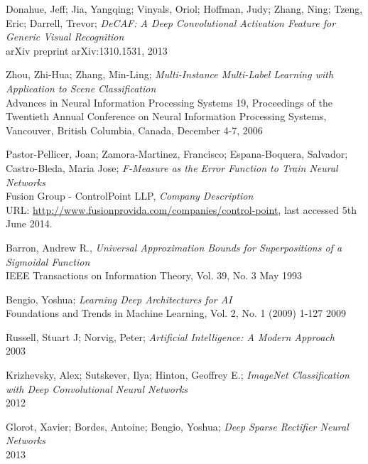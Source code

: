 \documentclass[a4paper,11pt]{article}
\begin{document}
\begin{thebibliography}{1}
 Donahue, Jeff; Jia, Yangqing; Vinyals, Oriol; Hoffman, Judy; Zhang, Ning; Tzeng, Eric; Darrell, Trevor;
  \emph{DeCAF: A Deep Convolutional Activation Feature for Generic Visual Recognition}\\
  arXiv preprint arXiv:1310.1531, 2013

 Zhou, Zhi-Hua; Zhang, Min-Ling;
  \emph{Multi-Instance Multi-Label Learning with Application to Scene Classification}\\
  Advances in Neural Information Processing Systems 19, 
  Proceedings of the Twentieth Annual Conference on Neural Information Processing Systems, 
  Vancouver, British Columbia, Canada, 
  December 4-7, 2006

 Pastor-Pellicer, Joan; Zamora-Martinez, Francisco; Espana-Boquera, Salvador; Castro-Bleda, Maria Jose;
  \emph{F-Measure as the Error Function to Train Neural Networks}\\

 Fusion Group - ControlPoint LLP,
 \emph{Company Description}\\
 URL: \url{http://www.fusionprovida.com/companies/control-point}, last accessed 5th June 2014. 
  
 Barron, Andrew R.,
 \emph{Universal Approximation Bounds for Superpositions of a Sigmoidal Function}\\
 IEEE Transactions on Information Theory, 
 Vol. 39, No. 3
 May 1993

 Bengio, Yoshua;
 \emph{Learning Deep Architectures for AI}\\
 Foundations and Trends in Machine Learning, 
 Vol. 2, No. 1 (2009) 1-127
 2009

 Russell, Stuart J; Norvig, Peter;
 \emph{Artificial Intelligence: A Modern Approach}\\
 2003

 Krizhevsky, Alex; Sutskever, Ilya; Hinton, Geoffrey E.;
 \emph{ImageNet Classification with Deep Convolutional Neural Networks}\\
 2012

 Glorot, Xavier; Bordes, Antoine; Bengio, Yoshua;
 \emph{Deep Sparse Rectifier Neural Networks}\\
 2013


\end{thebibliography}
\end{document}
